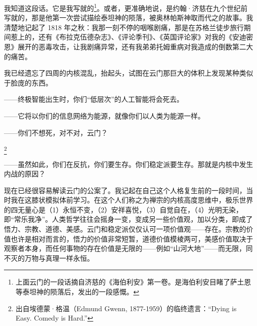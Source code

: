 \documentclass[AutoFakeBold=true]{book}
\begin{document}
\vspace*{1em}

我知道这段话。它是我写就的\footnote{上面云门的一段话摘自济慈的《海伯利安》第一卷。是海伯利安目睹了萨土恩等泰坦神的陨落后，发出的一段感慨。}。或者，更准确地说，是约翰·济慈在九个世纪前写就的，那是他第一次尝试描绘泰坦神的陨落，被奥林帕斯神取而代之的故事。我清楚地记起了 1818 年之秋：我那一刻不停的咽喉剧痛，那是在苏格兰徒步旅行期间惹上的，还有《布拉克伍德杂志》、《评论季刊》、《英国评论家》对我的《安迪密恩》展开的恶毒攻击，让我剧痛异常，还有我弟弟托姆重病对我造成的倒数第二大的痛苦。

我已经遗忘了四周的内核混乱，抬起头，试图在云门那巨大的体积上发现某种类似于脸庞的东西。

{\kaishu ——终极智能出生时，你们``低层次''的人工智能将会死去。}

{\heiti [对]}

{\kaishu ——它将以你们的信息网络为能源，就像你们以人类为能源一样。}

{\heiti [对]}

{\kaishu ——你们不想死，对不对，云门？}

{}\footnote{出自埃德蒙·格温（Edmund Gwenn, 1877-1959）的临终遗言：``Dying is Easy. Comedy is Hard.''}

{\kaishu ——虽然如此，你们在反抗，你们要生存。你们稳定派要生存。那就是内核中发生内战的原因？}

{}

现在已经很容易解读云门的公案了。我记起在自己这个人格复生前的一段时间，当时我在这膝状模拟体前学习。在这个人们称之为禅宗的内核高度思维中，极乐世界的四无量心是（1）永恒不变，（2）安祥喜悦，（3）自觉自在，（4）光明无染，即``常乐我净''。人类哲学往往会摇身一变，变成另一些价值观，加以分类，即成了悟力、宗教、道德、美感。云门和稳定派仅仅认可一项价值观——存在。宗教的价值也许是相对而言的，悟力的价值非常短暂，道德价值模棱两可，美感价值取决于观察者本身，而任何事物的存在价值是无限的——例如``山河大地''——而无限，同不灭的万物与真理一样永恒。
\end{document}

